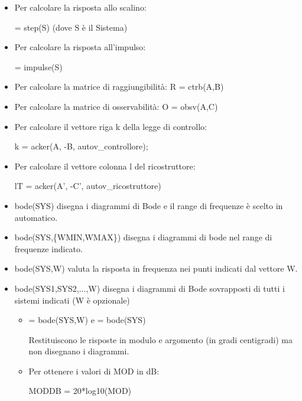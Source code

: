 \documentclass[10pt,a4paper]{book}
\begin{document}
\begin{itemize}
\item Per calcolare la risposta allo scalino:

{ = step(S)} (dove S è il Sistema)
\item Per calcolare la risposta all’impulso:

{ = impulse(S)}
\end{itemize}


\begin{itemize}
\item Per calcolare la matrice di raggiungibilità: {\selectfont R = ctrb(A,B)}
\item Per calcolare la matrice di osservabilità: {\selectfont O = obsv(A,C)}
\item Per calcolare il vettore riga {\selectfont k} della legge di controllo:

{\selectfont k = acker(A, -B, autov\_controllore);}
\item Per calcolare il vettore colonna {\selectfont l} del ricostruttore:

{\selectfont lT = acker(A', -C', autov\_ricostruttore)}
\end{itemize}


\begin{itemize}
\item {\selectfont bode(SYS)} disegna i diagrammi di Bode e il range di frequenze è scelto in automatico.
\item {\selectfont bode(SYS,\{WMIN,WMAX\})} disegna i diagrammi di bode nel range di frequenze indicato.
\item {\selectfont bode(SYS,W)} valuta la risposta in frequenza nei punti indicati dal vettore {\selectfont W}.
\item {\selectfont bode(SYS1,SYS2,...,W)} disegna i diagrammi di Bode sovrapposti di tutti i sistemi indicati ({\selectfont W} è opzionale)
\begin{itemize}

Chiamate:
\item { = bode(SYS,W)} e { = bode(SYS)}

Restituiscono le risposte in modulo e argomento (in gradi centigradi) ma non disegnano i diagrammi.
\item Per ottenere i valori di MOD in dB:

{\selectfont MODDB = 20*log10(MOD)}
\end{itemize}
\end{itemize}
\end{document}
